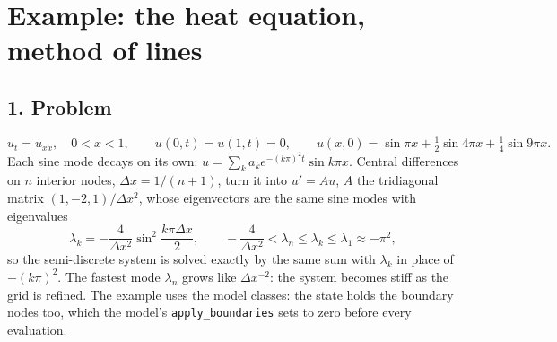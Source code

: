 \documentclass[11pt,a4paper]{article}
\begin{document}
\section*{Example: the heat equation, method of lines}

\subsection*{1. Problem}
\begin{equation*}
  u_t = u_{xx}, \quad 0 < x < 1, \qquad u(0, t) = u(1, t) = 0, \qquad
  u(x, 0) = \sin\pi x + \tfrac12\sin 4\pi x + \tfrac14\sin 9\pi x .
\end{equation*}
Each sine mode decays on its own: $u = \sum_k a_k e^{-(k\pi)^2 t}\sin k\pi x$.
Central differences on $n$ interior nodes, $\Delta x = 1/(n + 1)$, turn it
into $u' = Au$, $A$ the tridiagonal matrix $(1, -2, 1)/\Delta x^2$, whose
eigenvectors are the same sine modes with eigenvalues
\begin{equation*}
  \lambda_k = -\frac{4}{\Delta x^2}\sin^2\frac{k\pi\Delta x}{2},
  \qquad -\frac{4}{\Delta x^2} < \lambda_n \le \lambda_k \le \lambda_1 \approx -\pi^2 ,
\end{equation*}
so the semi-discrete system is solved exactly by the same sum with
$\lambda_k$ in place of $-(k\pi)^2$. The fastest mode $\lambda_n$ grows like
$\Delta x^{-2}$: the system becomes stiff as the grid is refined. The example
uses the model classes: the state holds the boundary nodes too, which the
model's \texttt{apply\_boundaries} sets to zero before every evaluation.
\begin{center}
\small

\end{center}

\newpage
\end{document}

